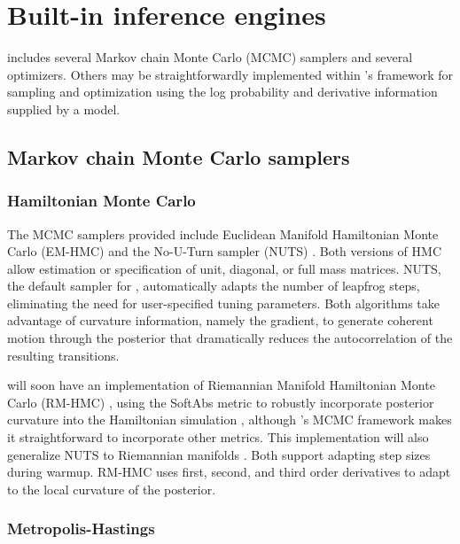 \documentclass[article]{jss}
\begin{document}
\section{Built-in inference engines}\label{inference-engines.section}

 includes several Markov chain Monte Carlo (MCMC)
samplers and several optimizers.  Others may be straightforwardly
implemented within 's  framework for
sampling and optimization using the log probability and derivative
information supplied by a model.

\subsection{Markov chain Monte Carlo samplers}

\subsubsection{Hamiltonian Monte Carlo}

The MCMC samplers provided include Euclidean Manifold Hamiltonian
Monte Carlo (EM-HMC) \citep{DuaneEtAl:1987, Neal:1994, Neal:2011} and
the No-U-Turn sampler (NUTS) \citep{HoffmanGelman:2011}.  Both
versions of HMC allow estimation or specification of unit, diagonal,
or full mass matrices.  NUTS, the default sampler for ,
automatically adapts the number of leapfrog steps, eliminating the 
need for user-specified tuning parameters.  Both algorithms take advantage
of curvature information, namely the gradient, to generate coherent motion
through the posterior that dramatically reduces the autocorrelation of
the resulting transitions.

 will soon have an implementation of Riemannian Manifold
Hamiltonian Monte Carlo (RM-HMC) \citep{GirolamiCalderhead:2011},
using the SoftAbs metric to robustly incorporate posterior curvature
into the Hamiltonian simulation \cite{Betancourt:2012}, although
's MCMC framework makes it
straightforward to incorporate other metrics.  This
implementation will also generalize NUTS to Riemannian manifolds
\citep{Betancourt:2013}.  Both support adapting step sizes during
warmup.  RM-HMC uses first, second, and third order derivatives 
to adapt to the local curvature of the posterior.

\subsubsection{Metropolis-Hastings}
\end{document}
